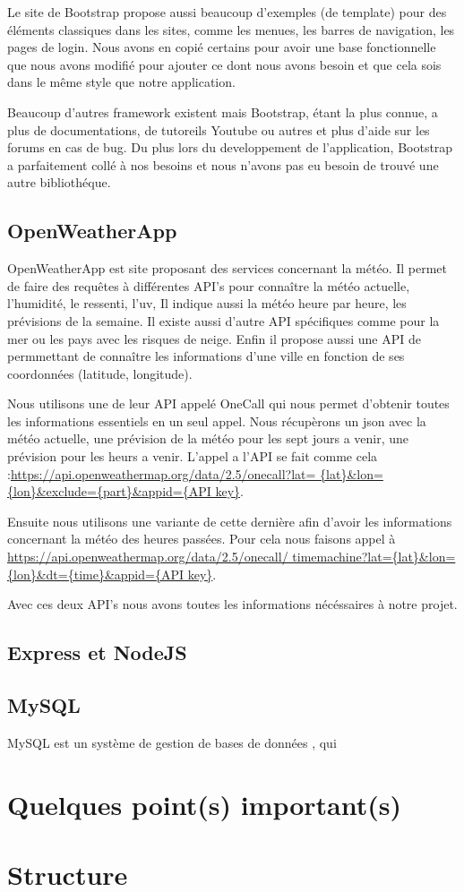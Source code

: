 \documentclass[a4paper, 12pt, french]{article}
\begin{document}
			Le site de Bootstrap propose aussi beaucoup d'exemples \cite*{Bootstrap-Exemples}
			(de template) pour des éléments classiques dans les sites, comme
			les menues, les barres de navigation, les pages de login. 
			Nous avons en copié certains pour avoir une base fonctionnelle 
			que nous avons modifié pour
			ajouter ce dont nous avons besoin et que cela sois dans le même
			style que notre application.

			Beaucoup d'autres framework existent mais Bootstrap, étant la plus connue, a plus de
			documentations, de tutoreils Youtube ou autres et plus d'aide sur les forums en cas de
			bug. Du plus lors du developpement de l'application, Bootstrap a parfaitement
			collé à nos besoins et nous n'avons pas eu besoin de trouvé une autre bibliothéque.

		\subsection{OpenWeatherApp}
			OpenWeatherApp \cite*{OpenWeatherApp} est site proposant des services 
      		concernant la météo. Il permet
			de faire des requêtes à différentes API's pour connaître la météo actuelle,
			l'humidité, le ressenti, l'uv, Il indique aussi la météo heure par heure, 
			les prévisions de la semaine. Il existe aussi d'autre API spécifiques comme 
			pour la mer ou les pays avec les risques de neige. Enfin il propose aussi 
			une API de permmettant de connaître les informations d'une ville
			en fonction de ses coordonnées (latitude, longitude).

			Nous utilisons une de leur API appelé OneCall \cite*{OpenWeatherApp-OneCall}
			qui nous permet d'obtenir toutes les informations essentiels en un seul appel.
			Nous récupèrons un json avec la météo actuelle, une prévision de la météo pour
			les sept jours a venir, une prévision pour les heurs a venir. L'appel a l'API se
			fait comme cela :\url{https://api.openweathermap.org/data/2.5/onecall?lat=
			{lat}&lon={lon}&exclude={part}&appid={API key}}.

			Ensuite nous utilisons une variante de cette dernière afin d'avoir les informations
			concernant la météo des heures passées. Pour cela nous faisons appel à 
			\url{https://api.openweathermap.org/data/2.5/onecall/
			timemachine?lat={lat}&lon={lon}&dt={time}&appid={API key}}.

			Avec ces deux API's nous avons toutes les informations nécéssaires à notre projet.

			
		\subsection{Express et NodeJS}

		\subsection{MySQL}
			MySQL est un système de gestion de bases de données \cite*{MySQL-wikipedia},
			qui %

	\section{Quelques point(s) important(s)}


	\section{Structure}


	\printbibliography
\end{document}
